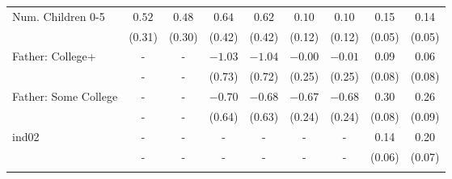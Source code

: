 \begin{tabular}{lcccccccc}
Num. Children 0-5&$0.52$&$0.48$&$0.64$&$0.62$&$0.10$&$0.10$&0.15&0.14\\
&(0.31)&(0.30)&(0.42)&(0.42)&(0.12)&(0.12)&(0.05)&(0.05)\\
Father: College+&-&-&$-1.03$&$-1.04$&$-0.00$&$-0.01$&0.09&0.06\\
&-&-&(0.73)&(0.72)&(0.25)&(0.25)&(0.08)&(0.08)\\
Father: Some College&-&-&$-0.70$&$-0.68$&$-0.67$&$-0.68$&0.30&0.26\\
&-&-&(0.64)&(0.63)&(0.24)&(0.24)&(0.08)&(0.09)\\
ind02&-&-&-&-&-&-&0.14&0.20\\
&-&-&-&-&-&-&(0.06)&(0.07)\\
\\
\bottomrule\end{tabular}